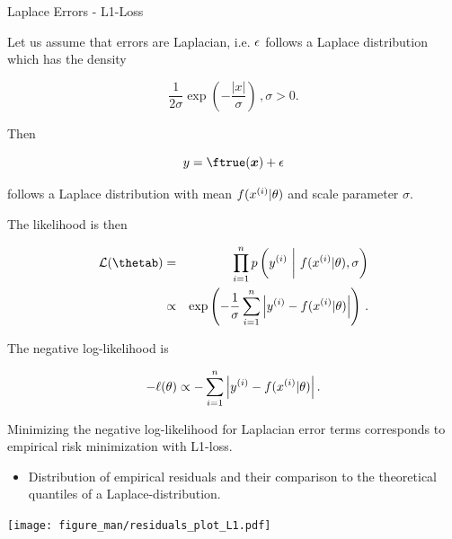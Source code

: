 \begin{vbframe}{Laplace Errors - L1-Loss}

Let us assume that errors are Laplacian, i.e. $\epsilon$ follows a Laplace distribution which has the density 

$$
 \frac{1}{2\sigma} \exp\left(-\frac{|x|}{\sigma}\right)\,, \sigma > 0.
$$ 

Then

$$
y = \ftrue(\xv) + \eps 
$$

follows a Laplace distribution with mean $f(x^{(i)} | \theta)$ and scale parameter $\sigma$. 

\framebreak 

The likelihood is then 

\begin{eqnarray*}
\LL(\thetab) &=& \prod_{i=1}^n \pdf\left(\yi ~\bigg|~ \fxit, \sigma\right) \\ &\propto& \exp\left(-\frac{1}{\sigma}\sumin \left|\yi - \fxit\right|\right)\,.
\end{eqnarray*}


The negative log-likelihood is

$$
- \ell(\theta) \propto - \sum_{i=1}^n \left|y^{(i)} - f(x^{(i)} | \theta)\right|.
$$

Minimizing the negative log-likelihood for Laplacian error terms corresponds to empirical risk minimization with L1-loss. 


\framebreak 

\begin{itemize}
\item Distribution of empirical residuals and their comparison to the theoretical quantiles of a Laplace-distribution. 
\end{itemize}

\texttt{[image: figure\_man/residuals\_plot\_L1.pdf]}

\end{vbframe}

